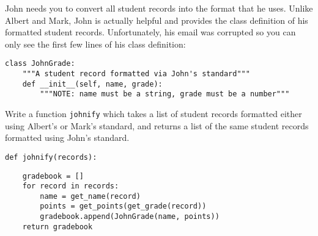 \question John needs you to convert all student records into
the format that he uses. Unlike Albert and Mark, John is actually
helpful and provides the class definition of his formatted student
records. Unfortunately, his email was corrupted so you can only see the
first few lines of his class definition:

\begin{lstlisting}
class JohnGrade:
    """A student record formatted via John's standard"""
    def __init__(self, name, grade):
        """NOTE: name must be a string, grade must be a number"""

\end{lstlisting}

Write a function {\tt johnify} which takes a list of student records
formatted either using Albert's or Mark's standard, and returns a list
of the same student records formatted using John's standard.

\begin{lstlisting}
def johnify(records):
\end{lstlisting}
\begin{solution}[.2in]
\begin{lstlisting}
    gradebook = []
    for record in records:
        name = get_name(record)
        points = get_points(get_grade(record))
        gradebook.append(JohnGrade(name, points))
    return gradebook
\end{lstlisting}
\end{solution}


